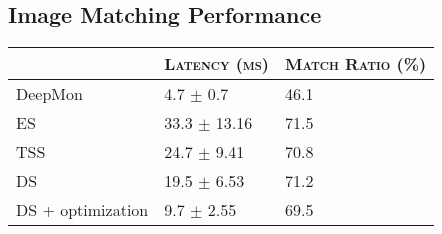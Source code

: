 \documentclass[10pt,acmtog]{acmart}
\newcommand{\framework}{DeepCache\xspace}
\newcommand{\sys}{\framework{}}
\newcommand{\revise}[1]{{#1}}
\begin{document}
\subsection{Image Matching Performance}\label{sec:eval_matching}%
\small
\centering
\begin{tabular}{L{2.5cm}ll} \hline
& \textsc{Latency (ms)} & \textsc{Match Ratio (\%)}\\\hline
DeepMon & 4.7 $\pm$ 0.7 & 46.1 \\ %
ES & 33.3 $\pm$ 13.16 & 71.5\\ %
TSS & 24.7 $\pm$ 9.41 & 70.8\\ %
DS & 19.5 $\pm$ 6.53 & 71.2\\ %
DS + optimization & 9.7 $\pm$ 2.55 & 69.5\\ \hline
\end{tabular}
\caption{\revise{A comparison of image matching algorithms between DeepMon~\cite{conf/mobisys/LocLB17} (row 1), which uses histogram-based matching, and \sys{} (the remaining rows) that uses different block matching algorithms in combination with optimization techniques mentioned in Section~\ref{sec:matching}.
\sys{} achieves much higher match ratios with minor increase in latency.}
}
\label{tab:eval_matching}
\end{document}
